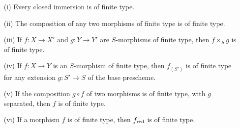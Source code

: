 \begin{proposition}[6.3.4]
\label{I.6.3.4}
\medskip\noindent
\begin{enumerate}
  \item[{\rm(i)}] Every closed immersion is of finite type.
  \item[{\rm(ii)}] The composition of any two morphisms of finite type is of finite type.
  \item[{\rm(iii)}] If $f:X\to X'$ and $g:Y\to Y'$ are $S$-morphisms of finite type, then $f\times_S g$ is of finite type.
  \item[{\rm(iv)}] If $f:X\to Y$ is an $S$-morphism of finite type, then $f_{(S')}$ is of finite type for any extension $g:S'\to S$ of the base prescheme.
  \item[{\rm(v)}] If the composition $g\circ f$ of two morphisms is of finite type, with $g$ separated, then $f$ is of finite type.
  \item[{\rm(vi)}] If a morphism $f$ is of finite type, then $f_{\mathrm{red}}$ is of finite type.
\end{enumerate}
\end{proposition}

